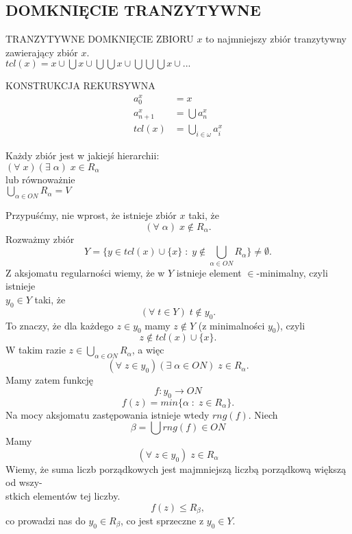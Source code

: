 \subsection{DOMKNIĘCIE TRANZYTYWNE}
\begin{center}\large
    {\color{def}TRANZYTYWNE DOMKNIĘCIE ZBIORU} $x$ to najmniejszy zbiór tranzytywny zawierający zbiór $x$.\smallskip\\
    $tcl(x)=x\cup\bigcup x\cup\bigcup\bigcup x\cup \bigcup\bigcup\bigcup x\cup...$
\end{center}
{\color{acc}\large KONSTRUKCJA REKURSYWNA}
\begin{align*}
    a_0^x&=x\\
    a_{n+1}^x&=\bigcup a_n^x\\
    tcl(x)&=\bigcup\limits_{i\in\omega}a_i^x
\end{align*}
\begin{center}\large
    Każdy zbiór jest w jakiejś hierarchii:\smallskip\\
    $(\forall\;x)(\exists\;\alpha)\;x\in R_\alpha$\medskip\\\normalsize
    lub równoważnie\smallskip\\
    $\bigcup\limits_{\alpha\in ON}R_\alpha=V$
\end{center}
\dowod
Przypuśćmy, nie wprost, że istnieje zbiór $x$ taki, że
$$(\forall\;\alpha)\;x\notin R_\alpha.$$
Rozważmy zbiór
$$Y=\{y\in tcl(x)\cup \{x\}\;:\;y\notin \bigcup\limits_{\alpha\in ON}R_\alpha\}\neq\emptyset.$$
Z aksjomatu regularności wiemy, że w $Y$ istnieje element $\in$-minimalny, czyli istnieje \\$y_0\in Y$ taki, że
$$(\forall\;t\in Y)\;t\notin y_0.$$
To znaczy, że dla każdego $z\in y_0$ mamy $z\notin Y$ (z minimalności $y_0$), czyli
$$z\notin tcl(x)\cup\{x\}.$$
W takim razie $z\in \bigcup\limits_{\alpha\in ON}R_\alpha$, a więc
$$(\forall\;z\in y_0)(\exists\;\alpha\in ON)\;z\in R_\alpha.$$
Mamy zatem funkcję
$$f:y_0\to ON$$
$$f(z)=min\{\alpha\;:\;z\in R_\alpha\}.$$
Na mocy aksjomatu zastępowania istnieje wtedy $rng(f)$. Niech
$$\beta=\bigcup rng(f)\in ON$$
Mamy 
$$(\forall\;z\in y_0)\;z\in R_\alpha$$
Wiemy, że suma liczb porządkowych jest majmniejszą liczbą porządkową większą od wszy-\\stkich elementów tej liczby.
$$f(z)\leq R_\beta,$$ co prowadzi nas do $y_0\in R_\beta$, co jest sprzeczne z $y_0\in Y$.